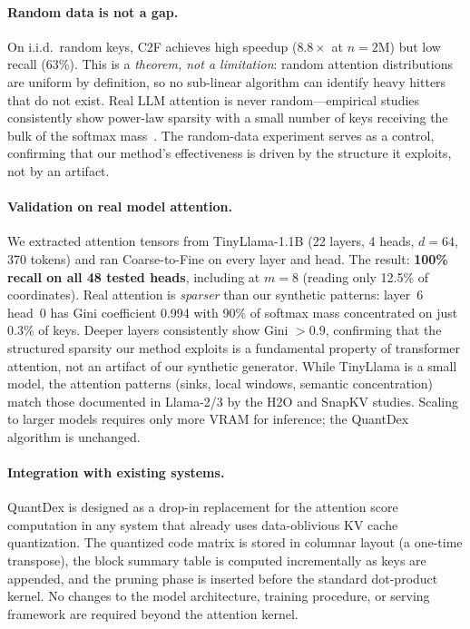 \documentclass[10pt,twocolumn]{article}
\theoremstyle{definition}
\begin{document}
\paragraph{Random data is not a gap.}
On i.i.d.\ random keys, C2F achieves high speedup ($8.8\times$ at $n = 2$M)
but low recall (63\%).  This is a \emph{theorem, not a limitation}: random
attention distributions are uniform by definition, so no sub-linear algorithm
can identify heavy hitters that do not exist.  Real LLM attention is never
random---empirical studies consistently show power-law sparsity with a small
number of keys receiving the bulk of the softmax mass~\cite{zhang2023h2o,
li2024snapkv}.  The random-data experiment serves as a control, confirming that
our method's effectiveness is driven by the structure it exploits, not by an
artifact.

\paragraph{Validation on real model attention.}
We extracted attention tensors from TinyLlama-1.1B (22 layers, 4 heads,
$d = 64$, 370 tokens) and ran Coarse-to-Fine on every layer and head.
The result: \textbf{100\% recall on all 48 tested heads}, including at
$m = 8$ (reading only 12.5\% of coordinates).  Real attention is
\emph{sparser} than our synthetic patterns: layer~6 head~0 has
Gini coefficient 0.994 with 90\% of softmax mass concentrated on just
0.3\% of keys.  Deeper layers consistently show Gini $> 0.9$, confirming
that the structured sparsity our method exploits is a fundamental property
of transformer attention, not an artifact of our synthetic generator.
While TinyLlama is a small model, the attention patterns (sinks, local
windows, semantic concentration) match those documented in Llama-2/3 by
the H2O and SnapKV studies.  Scaling to larger models requires only more
VRAM for inference; the QuantDex algorithm is unchanged.

\paragraph{Integration with existing systems.}
QuantDex is designed as a drop-in replacement for the attention score computation
in any system that already uses data-oblivious KV cache quantization.  The
quantized code matrix is stored in columnar layout (a one-time transpose), the
block summary table is computed incrementally as keys are appended, and the
pruning phase is inserted before the standard dot-product kernel.  No changes to
the model architecture, training procedure, or serving framework are required
beyond the attention kernel.
\end{document}
